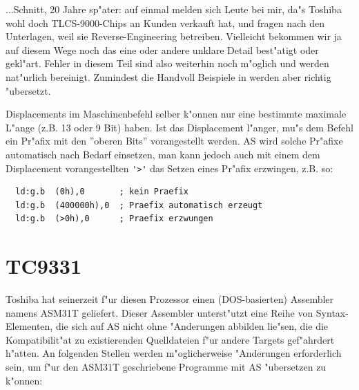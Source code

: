 \documentclass[12pt,a4paper,twoside]{report}
\newcommand{\asname}{AS}
\begin{document}
...Schnitt, 20 Jahre sp"ater: auf einmal melden sich Leute bei
mir, da"s Toshiba wohl doch TLCS-9000-Chips an Kunden verkauft
hat, und fragen nach den Unterlagen, weil sie Reverse-Engineering
betreiben.  Vielleicht bekommen wir ja auf diesem Wege noch das
eine oder andere unklare Detail best"atigt oder gekl"art.  Fehler in
diesem Teil sind also weiterhin noch m"oglich und werden nat"urlich
bereinigt.  Zumindest die Handvoll Beispiele in \cite{Tosh9000} werden
aber richtig "ubersetzt.

Displacements im Maschinenbefehl selber k"onnen nur eine bestimmte
maximale L"ange (z.B. 13 oder 9 Bit) haben.  Ist das Displacement
l"anger, mu"s dem Befehl ein Pr"afix mit den ''oberen Bits''
vorangestellt werden.  \asname{} wird solche Pr"afixe automatisch nach
Bedarf einsetzen, man kann jedoch auch mit einem dem Displacement
vorangestellten \verb!'>'! das Setzen eines Pr"afix erzwingen,
z.B. so:

\begin{verbatim}
  ld:g.b  (0h),0       ; kein Praefix
  ld:g.b  (400000h),0  ; Praefix automatisch erzeugt
  ld:g.b  (>0h),0      ; Praefix erzwungen
\end{verbatim}


\section{TC9331}

Toshiba hat seinerzeit f"ur diesen Prozessor einen (DOS-basierten)
Assembler namens ASM31T geliefert.  Dieser Assembler unterst"utzt
eine Reihe von Syntax-Elementen, die sich auf \asname{} nicht ohne
"Anderungen abbilden lie"sen, die die Kompatibilit"at
zu existierenden Quelldateien f"ur andere Targets gef"ahrdert
h"atten.  An folgenden Stellen werden m"oglicherweise "Anderungen
erforderlich sein, um f"ur den ASM31T geschriebene Programme mit
\asname{} "ubersetzen zu k"onnen:
\end{document}
